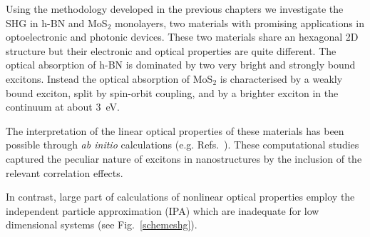 Using the methodology developed in the previous chapters we investigate the SHG in h-BN and MoS$_2$ monolayers, two materials with promising applications in optoelectronic and photonic devices. These two materials share an hexagonal 2D structure but their electronic and optical properties are quite different. The optical absorption of h-BN is dominated by two very bright and strongly bound excitons.\cite{PhysRevLett.96.126104,PhysRevLett.100.189701} Instead the optical absorption of MoS$_2$ is characterised by a weakly bound exciton, split by spin-orbit coupling,\cite{PhysRevLett.105.136805} and by a brighter exciton in the continuum at about 3~eV.\cite{molina2013effect} 

The interpretation of the linear optical properties of these materials has been possible through \emph{ab initio} calculations (e.g. Refs.~\cite{molina2013effect,PhysRevLett.100.189701}). These computational studies captured the peculiar nature of excitons in nanostructures\cite{scholes2006excitons} by the inclusion of the relevant correlation effects.


In contrast, large part of calculations of nonlinear optical properties employ the independent particle approximation\cite{guo2005second,margulis2013optical} (IPA) which are inadequate for low dimensional systems (see Fig.~\ref{schemeshg}).\cite{scholes2006excitons} 

